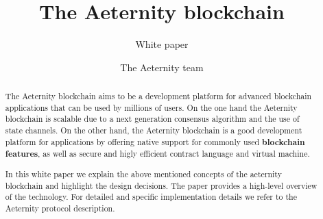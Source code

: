 \documentclass{paper}
\begin{document}
%
\title{The Aeternity blockchain}
\subtitle{White paper}

\author{The Aeternity team}

\maketitle

%
\begin{abstract}
The Aeternity blockchain aims to be a development platform for advanced blockchain applications that can be used by millions of users.
On the one hand the Aeternity blockchain is scalable due to a next generation
consensus algorithm and the use of state channels. On the other hand,
the Aeternity blockchain is a good development platform for
applications by offering native support for commonly used
\textbf{blockchain features}, as well as secure and higly efficient
contract language and virtual machine.

In this white paper we explain the above mentioned concepts of the
aeternity blockchain and highlight the design decisions. The
paper provides a high-level overview of the technology. For detailed
and specific implementation details we refer to the Aeternity protocol
description.

\end{abstract}








% 
%

 
\end{document}
